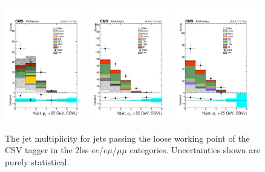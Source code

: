 \begin{figure}[htp]
\centering
\includegraphics[width=0.32\textwidth]{ch5_figs/nJets_CSVL_ttH_ee_stackPlot_SR.pdf}
\includegraphics[width=0.32\textwidth]{ch5_figs/nJets_CSVL_ttH_em_stackPlot_SR.pdf}
\includegraphics[width=0.32\textwidth]{ch5_figs/nJets_CSVL_ttH_mm_stackPlot_SR.pdf} \\
\caption[Data/MC comparison of the CSVL jet multiplicity in the signal region]{The jet multiplicity for jets passing the loose working point of the CSV tagger in the 2lss $ee$/$e\mu$/$\mu\mu$ categories. Uncertainties shown are purely statistical.}
\label{fig:sr_njets_csvl}
\end{figure}

